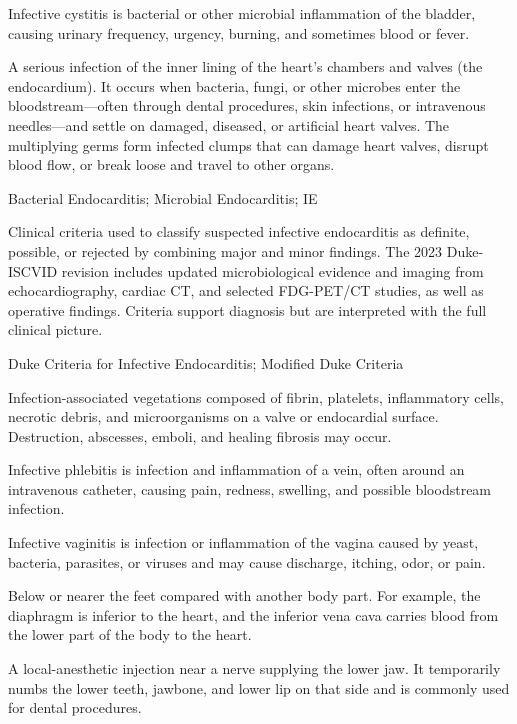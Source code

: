  Infective cystitis is bacterial or other microbial inflammation of the bladder, causing urinary frequency, urgency, burning, and sometimes blood or fever.

 A serious infection of the inner lining of the heart's chambers and valves (the endocardium). It occurs when bacteria, fungi, or other microbes enter the bloodstream---often through dental procedures, skin infections, or intravenous needles---and settle on damaged, diseased, or artificial heart valves. The multiplying germs form infected clumps that can damage heart valves, disrupt blood flow, or break loose and travel to other organs.

\synonyms
Bacterial Endocarditis; Microbial Endocarditis; IE

 Clinical criteria used to classify suspected
infective endocarditis as definite, possible, or rejected by combining major and minor
findings. The 2023 Duke-ISCVID revision includes updated microbiological evidence and
imaging from echocardiography, cardiac CT, and selected FDG-PET/CT studies, as well as
operative findings. Criteria support diagnosis but are interpreted with the full clinical picture.

\synonyms
Duke Criteria for Infective Endocarditis; Modified Duke Criteria

 Infection-associated vegetations composed of fibrin, platelets, inflammatory cells, necrotic debris, and microorganisms on a valve or endocardial surface. Destruction, abscesses, emboli, and healing fibrosis may occur.

 Infective phlebitis is infection and inflammation of a vein, often around an intravenous catheter, causing pain, redness, swelling, and possible bloodstream infection.

 Infective vaginitis is infection or inflammation of the vagina caused by yeast, bacteria, parasites, or viruses and may cause discharge, itching, odor, or pain.

 Below or nearer the feet compared with another body part. For example, the diaphragm is inferior to the heart, and the inferior vena cava carries blood from the lower part of the body to the heart.

 A local-anesthetic injection near a nerve supplying the lower jaw. It temporarily numbs the lower teeth, jawbone, and lower lip on that side and is commonly used for dental procedures.

